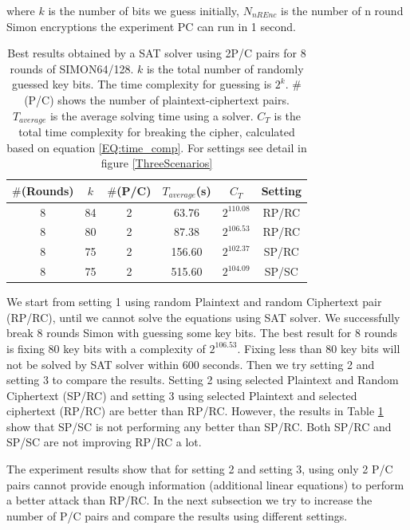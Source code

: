 where $k$ is the number of bits we guess initially, $N_{nREnc}$ is the number of n round Simon encryptions the experiment PC can run in 1 second.

\begin{table}[!hh]
	\caption[Best results obtained by a SAT solver using 2P/C pairs]{Best results obtained by a SAT solver using 2P/C pairs for 8 rounds of SIMON64/128. $k$ is the total number of randomly guessed key bits. The time complexity for guessing is $2^{k}$. $\#$(P/C) shows the number of plaintext-ciphertext pairs. $T_{average}$ is the average solving time using a solver. $C_T$  is the total time complexity for breaking the cipher, calculated based on equation \ref{EQ:time_comp}. For settings see detail in figure \ref{ThreeScenarios}}\label{tab:example1} \centering
	\begin{tabular}{|c|c|c|c|c|c|}
		\hline
		$\#$(Rounds) & $k$ & $\#$(P/C) & $T_{average}$(s) & $C_T$ & Setting \\
		\hline
		8 & 84 & 2 & 63.76   & $2^{110.08}$ & RP/RC \\
		8 & 80 & 2 & 87.38   & $2^{106.53}$ & RP/RC \\
		\hline
		8 & 75 & 2 & 156.60  & $2^{102.37}$ & SP/RC \\
		\hline
		8 & 75 & 2 & 515.60  & $2^{104.09}$ & SP/SC \\
		\hline
	\end{tabular}
\end{table}

We start from setting 1 using random Plaintext and random Ciphertext pair (RP/RC), until we cannot solve the equations using SAT solver. We successfully break 8 rounds Simon with guessing some key bits. The best result for 8 rounds is fixing 80 key bits with a complexity of $2^{106.53}$. Fixing less than 80 key bits will not be solved by SAT solver within 600 seconds. Then we try setting 2 and setting 3 to compare the results. Setting 2 using selected Plaintext and Random Ciphertext (SP/RC) and setting 3 using selected Plaintext and selected ciphertext (RP/RC) are better than RP/RC. However, the results in Table \ref{tab:example1} show that SP/SC is not performing any better than SP/RC. Both SP/RC and SP/SC are not improving RP/RC a lot. 

The experiment results show that for setting 2 and setting 3, using only 2 P/C pairs cannot provide enough information (additional linear equations) to perform a better attack than RP/RC. In the next subsection we try to increase the number of P/C pairs and compare the results using different settings.

